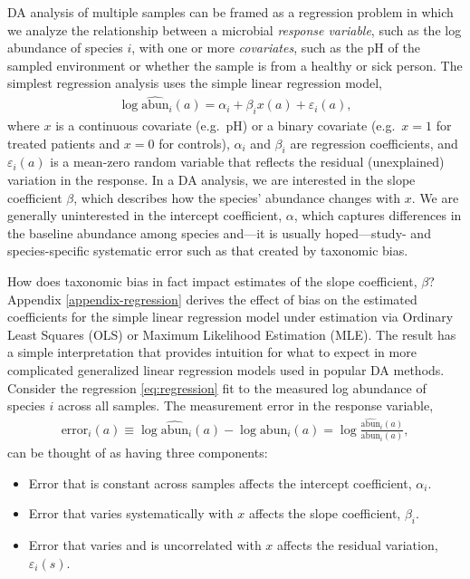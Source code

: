 \documentclass[
]{article}
\providecommand{\tightlist}{%
  \setlength{\itemsep}{0pt}\setlength{\parskip}{0pt}}
\begin{document}
DA analysis of multiple samples can be framed as a regression problem in which we analyze the relationship between a microbial \emph{response variable}, such as the log abundance of species \(i\), with one or more \emph{covariates}, such as the pH of the sampled environment or whether the sample is from a healthy or sick person.
The simplest regression analysis uses the simple linear regression model,
\begin{align}
  \label{eq:regression}
  \log \widehat{\text{abun}}_i(a) = \alpha_i + \beta_i x(a) + \varepsilon_i(a),
\end{align}
where \(x\) is a continuous covariate (e.g.~pH) or a binary covariate (e.g.~\(x=1\) for treated patients and \(x=0\) for controls), \(\alpha_i\) and \(\beta_i\) are regression coefficients, and \(\varepsilon_i(a)\) is a mean-zero random variable that reflects the residual (unexplained) variation in the response.
In a DA analysis, we are interested in the slope coefficient \(\beta\), which describes how the species' abundance changes with \(x\).
We are generally uninterested in the intercept coefficient, \(\alpha\), which captures differences in the baseline abundance among species and---it is usually hoped---study- and species-specific systematic error such as that created by taxonomic bias.

How does taxonomic bias in fact impact estimates of the slope coefficient, \(\beta\)?
Appendix \ref{appendix-regression} derives the effect of bias on the estimated coefficients for the simple linear regression model under estimation via Ordinary Least Squares (OLS) or Maximum Likelihood Estimation (MLE).
The result has a simple interpretation that provides intuition for what to expect in more complicated generalized linear regression models used in popular DA methods.
Consider the regression \eqref{eq:regression} fit to the measured log abundance of species \(i\) across all samples.
The measurement error in the response variable,
\begin{align}
  \text{error}_{i}(a) \equiv 
  \log \widehat{\text{abun}}_i(a) - \log \text{abun}_i(a)
  = \log \frac{\widehat{\text{abun}}_i(a)}{\text{abun}_i(a)},
\end{align}
can be thought of as having three components:

\begin{itemize}
\tightlist
\item
  Error that is constant across samples affects the intercept coefficient, \(\alpha_i\).
\item
  Error that varies systematically with \(x\) affects the slope coefficient, \(\beta_i\).
\item
  Error that varies and is uncorrelated with \(x\) affects the residual variation, \(\varepsilon_{i}(s)\).
\end{itemize}
\end{document}
